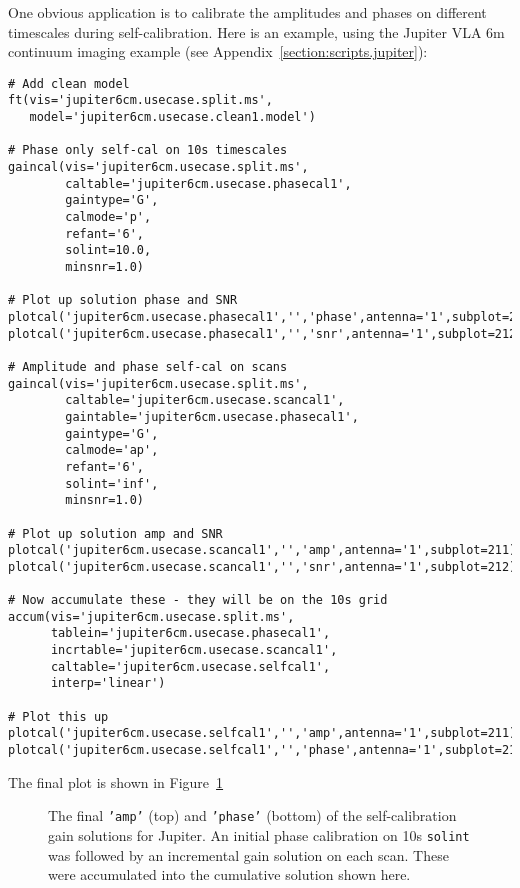 One obvious application is to calibrate the amplitudes and phases
on different timescales during self-calibration.
Here is an example, using the Jupiter VLA 6m continuum imaging 
example (see Appendix~\ref{section:scripts.jupiter}):
\small
\begin{verbatim}
# Add clean model 
ft(vis='jupiter6cm.usecase.split.ms',
   model='jupiter6cm.usecase.clean1.model')

# Phase only self-cal on 10s timescales
gaincal(vis='jupiter6cm.usecase.split.ms',
        caltable='jupiter6cm.usecase.phasecal1',
        gaintype='G',
        calmode='p',
        refant='6',
        solint=10.0,
        minsnr=1.0)

# Plot up solution phase and SNR
plotcal('jupiter6cm.usecase.phasecal1','','phase',antenna='1',subplot=211)
plotcal('jupiter6cm.usecase.phasecal1','','snr',antenna='1',subplot=212)

# Amplitude and phase self-cal on scans
gaincal(vis='jupiter6cm.usecase.split.ms',
        caltable='jupiter6cm.usecase.scancal1',
        gaintable='jupiter6cm.usecase.phasecal1',
        gaintype='G',
        calmode='ap',
        refant='6',
        solint='inf',
        minsnr=1.0)

# Plot up solution amp and SNR
plotcal('jupiter6cm.usecase.scancal1','','amp',antenna='1',subplot=211)
plotcal('jupiter6cm.usecase.scancal1','','snr',antenna='1',subplot=212)

# Now accumulate these - they will be on the 10s grid
accum(vis='jupiter6cm.usecase.split.ms',
      tablein='jupiter6cm.usecase.phasecal1',
      incrtable='jupiter6cm.usecase.scancal1',
      caltable='jupiter6cm.usecase.selfcal1',
      interp='linear')

# Plot this up
plotcal('jupiter6cm.usecase.selfcal1','','amp',antenna='1',subplot=211)
plotcal('jupiter6cm.usecase.selfcal1','','phase',antenna='1',subplot=212)
\end{verbatim}
\normalsize
The final plot is shown in Figure~\ref{fig:accum_jupiter}

\begin{figure}[h!]
\begin{center}
\caption{\label{fig:accum_jupiter} The final {\tt 'amp'} (top) and
{\tt 'phase'} (bottom) of the self-calibration gain solutions
for Jupiter.  An initial phase calibration on 10s {\tt solint} was
followed by an incremental gain solution on each scan.  These
were accumulated into the cumulative solution shown here.
}
\hrulefill
\end{center}
\end{figure}

